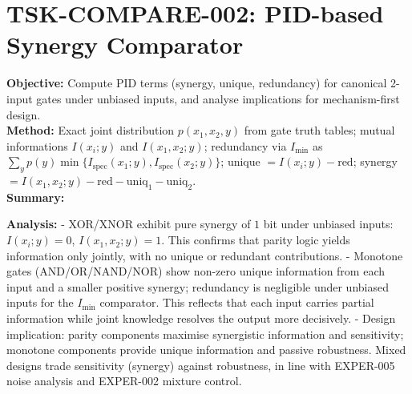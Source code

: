 \documentclass{article}
\begin{document}
\section{TSK-COMPARE-002: PID-based Synergy Comparator}
\textbf{Objective:} Compute PID terms (synergy, unique, redundancy) for canonical 2-input gates under unbiased inputs, and analyse implications for mechanism-first design.\\
\textbf{Method:} Exact joint distribution $p(x_1,x_2,y)$ from gate truth tables; mutual informations $I(x_i;y)$ and $I(x_1,x_2;y)$; redundancy via $I_{\min}$ as $\sum_y p(y)\min\{I_{\mathrm{spec}}(x_1;y),I_{\mathrm{spec}}(x_2;y)\}$; unique $= I(x_i;y)-\mathrm{red}$; synergy $= I(x_1,x_2;y)-\mathrm{red}-\mathrm{uniq}_1-\mathrm{uniq}_2$.\\
\textbf{Summary:}\\
\begin{center}
\end{center}
\textbf{Analysis:}
- XOR/XNOR exhibit pure synergy of $1$ bit under unbiased inputs: $I(x_i;y)=0$, $I(x_1,x_2;y)=1$. This confirms that parity logic yields information only jointly, with no unique or redundant contributions.
- Monotone gates (AND/OR/NAND/NOR) show non-zero unique information from each input and a smaller positive synergy; redundancy is negligible under unbiased inputs for the $I_{\min}$ comparator. This reflects that each input carries partial information while joint knowledge resolves the output more decisively.
- Design implication: parity components maximise synergistic information and sensitivity; monotone components provide unique information and passive robustness. Mixed designs trade sensitivity (synergy) against robustness, in line with EXPER-005 noise analysis and EXPER-002 mixture control.
\end{document}
